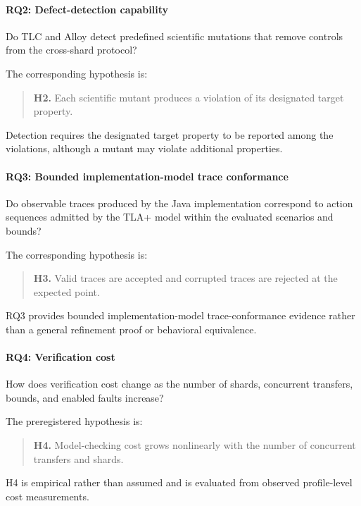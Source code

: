 \paragraph{RQ2: Defect-detection capability}

Do TLC and Alloy detect predefined scientific mutations that remove controls
from the cross-shard protocol?

The corresponding hypothesis is:

\begin{quote}
\textbf{H2.} Each scientific mutant produces a violation of its designated
target property.
\end{quote}

Detection requires the designated target property to be reported among the
violations, although a mutant may violate additional properties.

\paragraph{RQ3: Bounded implementation-model trace conformance}

Do observable traces produced by the Java implementation correspond to action
sequences admitted by the TLA+ model within the evaluated scenarios and bounds?

The corresponding hypothesis is:

\begin{quote}
\textbf{H3.} Valid traces are accepted and corrupted traces are rejected at the
expected point.
\end{quote}

RQ3 provides bounded implementation-model trace-conformance evidence rather
than a general refinement proof or behavioral equivalence.

\paragraph{RQ4: Verification cost}

How does verification cost change as the number of shards, concurrent
transfers, bounds, and enabled faults increase?

The preregistered hypothesis is:

\begin{quote}
\textbf{H4.} Model-checking cost grows nonlinearly with the number of concurrent
transfers and shards.
\end{quote}

H4 is empirical rather than assumed and is evaluated from observed
profile-level cost measurements.

